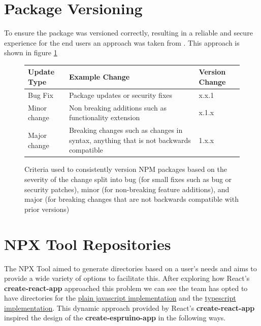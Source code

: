 \documentclass{l4proj}
\begin{document}
\section{Package Versioning}
To ensure the package was versioned correctly, resulting in a reliable and secure experience for the end users an approach was taken from \citep{NPM-package-versioning}. This approach is shown in figure \ref{fig:NPM-versioning}

\begin{figure}[!ht]
    
\begin{center}
\begin{tabular}{|p{2.25cm}|p{7.25cm}|p{3.25cm}|}
 \hline
 \textbf{Update Type} & \textbf{Example Change} & \textbf{Version Change} \\
 \hline
 \hline
Bug Fix & Package updates or security fixes  &  x.x.1  \\
 \hline
Minor change & Non breaking additions such as functionality extension  &  x.1.x  \\
 \hline
Major change & Breaking changes such as changes in syntax, anything that is not backwards compatible  &  1.x.x  \\
 \hline
\end{tabular}
\end{center} 
    \caption{Criteria used to consistently version NPM packages based on the severity of the change split into bug (for small fixes such as bug or security patches), minor (for non-breaking feature additions), and major (for breaking changes that are not backwards compatible with prior versions)}
    \label{fig:NPM-versioning}
\end{figure}

\section{NPX Tool Repositories}
The NPX Tool aimed to generate directories based on a user's needs and aims to provide a wide variety of options to facilitate this. After exploring how React's \textbf{create-react-app} approached this problem we can see the team has opted to have directories for the \href{https://github.com/facebook/create-react-app/tree/main/packages/cra-template}{plain javascript implementation} and the \href{https://github.com/facebook/create-react-app/tree/main/packages/cra-template-typescript}{typescript implementation}. This dynamic approach provided by React's \textbf{create-react-app} inspired the design of the \textbf{create-espruino-app} in the following ways.
\end{document}
